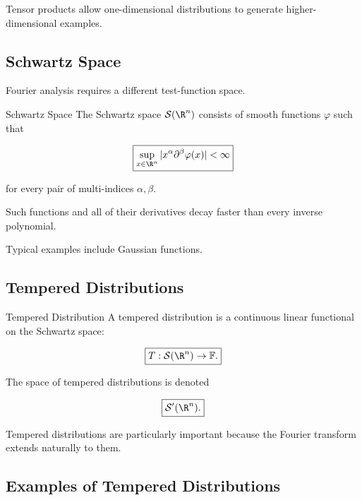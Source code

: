 Tensor products allow one-dimensional distributions to generate
higher-dimensional examples.

\subsection{Schwartz Space}
\label{subsec:schwartz-space}

Fourier analysis requires a different test-function space.

\begin{definitionbox}{Schwartz Space}
The Schwartz space \(\mathcal{S}(\R^n)\) consists of smooth functions
\(\varphi\) such that

\[
\boxed{
\sup_{x\in\R^n}
|x^\alpha\partial^\beta\varphi(x)|
<
\infty
}
\]

for every pair of multi-indices \(\alpha,\beta\).
\end{definitionbox}

Such functions and all of their derivatives decay faster than every
inverse polynomial.

Typical examples include Gaussian functions.

\subsection{Tempered Distributions}
\label{subsec:tempered-distributions}

\begin{definitionbox}{Tempered Distribution}
A tempered distribution is a continuous linear functional on the
Schwartz space:

\[
\boxed{
T:\mathcal{S}(\R^n)\to\mathbb{F}.
}
\]
\end{definitionbox}

The space of tempered distributions is denoted

\[
\boxed{
\mathcal{S}'(\R^n).
}
\]

Tempered distributions are particularly important because the Fourier
transform extends naturally to them.

\subsection{Examples of Tempered Distributions}
\label{subsec:tempered-examples}


